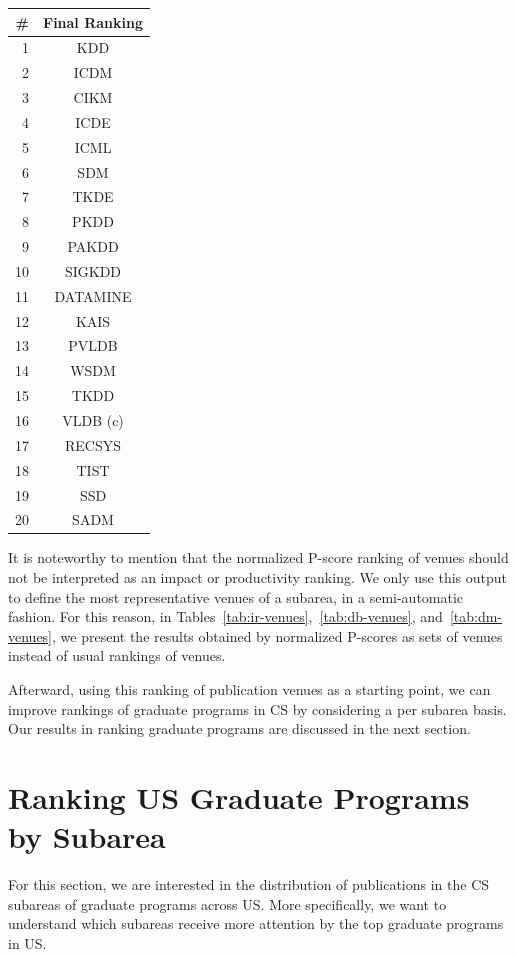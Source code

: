 \documentclass[msc]{ppgccufmg}
\begin{document}
\begin{table}[htbp]
\begin{tabular}{rc}
\toprule
\#		&	Final Ranking \\ 
\midrule
1		&		KDD			\\
2		&		ICDM		\\
3		&		CIKM		\\
4		&		ICDE		\\
5		&		ICML		\\
6		&		SDM			\\
7		&		TKDE		\\
8		&		PKDD		\\
9		&		PAKDD		\\
10		&		SIGKDD		\\
11		&		DATAMINE	\\
12		&		KAIS		\\
13		&		PVLDB		\\
14		&		WSDM		\\
15		&		TKDD		\\
16		&		VLDB (c)	\\
17		&		RECSYS		\\
18		&		TIST		\\
19		&		SSD			\\
20		&		SADM		\\
\bottomrule
\end{tabular}
\end{table}

It is noteworthy to mention that the normalized P-score ranking of venues should not be interpreted as an impact or productivity ranking. We only use this output to define the most representative venues of a subarea, in a semi-automatic fashion. For this reason, in Tables~\ref{tab:ir-venues},~\ref{tab:db-venues}, and~\ref{tab:dm-venues}, we present the results obtained by normalized P-scores as sets of venues instead of usual rankings of venues.

Afterward, using this ranking of publication venues as a starting point, we can improve rankings of graduate programs in CS by considering a per subarea basis. Our results in ranking graduate programs are discussed in the next section.

\section{Ranking US Graduate Programs by Subarea}\label{sec:results-us}

For this section, we are interested in the distribution of publications in the CS subareas of graduate programs across US. More specifically, we want to understand which subareas receive more attention by the top graduate programs in US. 
\end{document}
